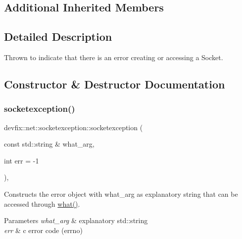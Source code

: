 \subsection*{Additional Inherited Members}


\subsection{Detailed Description}
Thrown to indicate that there is an error creating or accessing a Socket. 

\subsection{Constructor \& Destructor Documentation}
\mbox{\label{structdevfix_1_1net_1_1socketexception_aeab5d004d494103b37156a5f23a5296a}} 
\subsubsection{\texorpdfstring{socketexception()}{socketexception()}\hspace{0.1cm}{\footnotesize\ttfamily [1/2]}}
{\footnotesize\ttfamily devfix\+::net\+::socketexception\+::socketexception (\begin{DoxyParamCaption}\item[{const std\+::string \&}]{what\+\_\+arg,  }\item[{int}]{err = {\ttfamily -\/1} }\end{DoxyParamCaption})\hspace{0.3cm}{\ttfamily [inline]}, {\ttfamily [explicit]}}

Constructs the error object with what\+\_\+arg as explanatory string that can be accessed through \hyperlink{structdevfix_1_1base_1_1error_1_1baseexception_a16327152a55d65b1e537825231fbd452}{what()}. 
\begin{DoxyParams}{Parameters}
{\em what\+\_\+arg} & explanatory std\+::string \\
\hline
{\em err} & c error code (errno) \\
\hline
\end{DoxyParams}
\mbox{\label{structdevfix_1_1net_1_1socketexception_a6da69f635eb11f932a0e960545d023bd}} 
